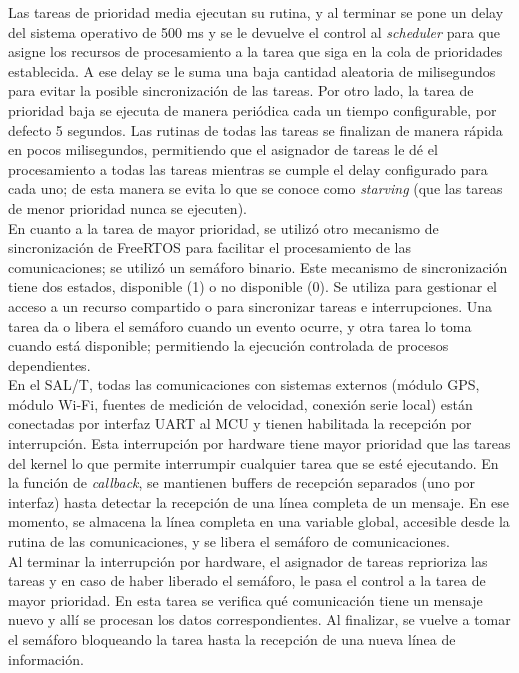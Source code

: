 Las tareas de prioridad media ejecutan su rutina, y al terminar se pone un delay del sistema operativo de 500 ms y se le devuelve el control al \textit{scheduler} para que asigne los recursos de procesamiento a la tarea que siga en la cola de prioridades establecida. A ese delay se le suma una baja cantidad aleatoria de milisegundos para evitar la posible sincronización de las tareas. Por otro lado, la tarea de prioridad baja se ejecuta de manera periódica cada un tiempo configurable, por defecto 5 segundos. Las rutinas de todas las tareas se finalizan de manera rápida en pocos milisegundos, permitiendo que el asignador de tareas le dé el procesamiento a todas las tareas mientras se cumple el delay configurado para cada uno; de esta manera se evita lo que se conoce como \textit{starving} (que las tareas de menor prioridad nunca se ejecuten). \\ 

En cuanto a la tarea de mayor prioridad, se utilizó otro mecanismo de sincronización de FreeRTOS para facilitar el procesamiento de las comunicaciones; se utilizó un semáforo binario. Este mecanismo de sincronización tiene dos estados, disponible (1) o no disponible (0). Se utiliza para gestionar el acceso a un recurso compartido o para sincronizar tareas e interrupciones. Una tarea da o libera el semáforo cuando un evento ocurre, y otra tarea lo toma cuando está disponible; permitiendo la ejecución controlada de procesos dependientes. \\

En el SAL/T, todas las comunicaciones con sistemas externos (módulo GPS, módulo Wi-Fi, fuentes de medición de velocidad, conexión serie local) están conectadas por interfaz UART al MCU y tienen habilitada la recepción por interrupción. Esta interrupción por hardware tiene mayor prioridad que las tareas del kernel lo que permite interrumpir cualquier tarea que se esté ejecutando. En la función de \textit{callback}, se mantienen buffers de recepción separados (uno por interfaz) hasta detectar la recepción de una línea completa de un mensaje. En ese momento, se almacena la línea completa en una variable global, accesible desde la rutina de las comunicaciones, y se libera el semáforo de comunicaciones. \\

Al terminar la interrupción por hardware, el asignador de tareas reprioriza las tareas y en caso de haber liberado el semáforo, le pasa el control a la tarea de mayor prioridad. En esta tarea se verifica qué comunicación tiene un mensaje nuevo y allí se procesan los datos correspondientes. Al finalizar, se vuelve a tomar el semáforo bloqueando la tarea hasta la recepción de una nueva línea de información. 

 